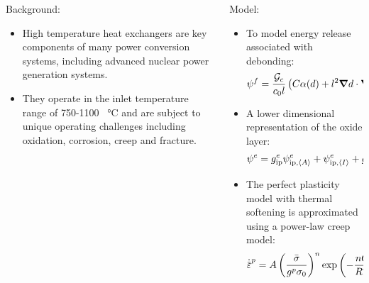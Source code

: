 \begin{frame}
\begin{columns}[T]
\begin{column}{0.5\textwidth}
      Background:
      \begin{itemize}
        \item \textcolor{peggyblue}{High temperature heat exchangers} are key components of many power conversion systems, including advanced nuclear power generation systems.
        \item They operate in the inlet temperature range of 750-1100 \SI{}{\celsius} and are subject to unique operating challenges including \textcolor{peggyblue}{oxidation}, \textcolor{peggyblue}{corrosion}, \textcolor{peggyblue}{creep} and \textcolor{peggyblue}{fracture}.
      \end{itemize}
    \end{column}
    \begin{column}{0.5\textwidth}
      Model:
      \begin{itemize}
        \item To model energy release associated with debonding:
              \begin{align*}
                \psi^f = \dfrac{{\mathcal{G}_c}}{c_0 l} \left( C\alpha(d) + l^2 \boldsymbol{\nabla} d \cdot \boldsymbol{\nabla} d \right) + \dfrac{1}{\tau} \mathcal{G} \omega(c).
              \end{align*}
        \item A lower dimensional representation of the oxide layer:
              \begin{align*}
                \psi^e & =  g^e_\text{ip} \psi^e_{\text{ip}, {\left< A \right>}} + \psi^e_{\text{ip}, {\left< I \right>}} + g^e_\text{op} \psi^e_{\text{op}, {\left< A \right>}} + \psi^e_{\text{ip}, {\left< I \right>}}. 
              \end{align*}
        \item The perfect plasticity model with thermal softening is approximated using a power-law creep model:
              \begin{align*}
                \epdot = A \left( \dfrac{\bar{\sigma}}{g^p \sigma_0} \right)^n \exp\left( -\dfrac{nQ}{RT} \right).
              \end{align*}
      \end{itemize}
    \end{column}
  \end{columns}
\end{frame}

